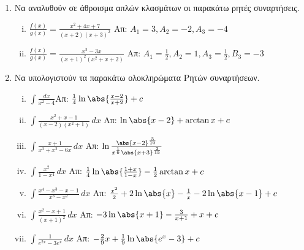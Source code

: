 


\pagestyle{askhseis}
\everymath{\displaystyle}




\begin{center}
  \minibox{\bfseries\large \textcolor{Col1}{Ολοκληρώματα Ρητών και Άρρητων Συναρτήσεων}}
\end{center}

\vspace{\baselineskip}

\begin{enumerate}
  \item Να αναλυθούν σε άθροισμα απλών κλασμάτων οι παρακάτω ρητές συναρτήσεις.
    \begin{enumerate}[i)]
      \item $\frac{f(x)}{g(x)}=\frac{x^2+4x+7}{(x+2)(x+3)^2}$ 
        \hfill Απ: $A_1=3, A_2=-2, A_3=-4$
      \item $\frac{f(x)}{g(x)}=\frac{x^3-3x}{(x+1)^2(x^2+x+2)}$ 
        \hfill Απ: $A_1=\frac{1}{2}, A_2=1, A_3=\frac{1}{2}, B_3=-3$
    \end{enumerate}

  \item Να υπολογιστούν τα παρακάτω ολοκληρώματα Ρητών συναρτήσεων.
    \begin{enumerate}[i)]
      \item $\int\frac{dx}{x^2-4}$\hfill Απ: $\frac{1}{4}\ln\abs{\frac{x-2}{x+2}}+c$
      \item $\int\frac{x^2+x-1}{(x-2)(x^2+1)}\,dx$ \hfill Απ: $\ln\abs{x-2}+\arctan x+c$
      \item $\int\frac{x+1}{x^3+x^2-6x}\,dx$ 
        \hfill Απ: $\ln\frac{\abs{x-2}^{\frac{3}{10}}}{x^{\frac{1}{6}}
        \abs{x+3}^{\frac{2}{15}}}$
      \item $\int\frac{x^2}{1-x^4}\,dx$ 
        \hfill Απ: $\frac{1}{4}\ln\abs{\frac{1+x}{1-x}}-\frac{1}{2}\arctan x+c$
      \item $\int\frac{x^4-x^3-x-1}{x^3-x^2}\,dx$ 
        \hfill Απ: $\frac{x^2}{2}+2\ln\abs{x}-\frac{1}{x}-2\ln\abs{x-1}+c$
      \item $\int \frac{x^2-x+1}{(x+1)^2}\,dx$
        \hfill Απ: $-3\ln\abs{x+1}-\frac{3}{x+1}+x+c$
      \item $\int\frac{1}{e^{2x}-3e^{x}}\,dx$ 
        \hfill Απ: $-\frac{2}{9}x+\frac{1}{9}\ln\abs{e^x-3}+c$
    \end{enumerate}


\end{enumerate}
